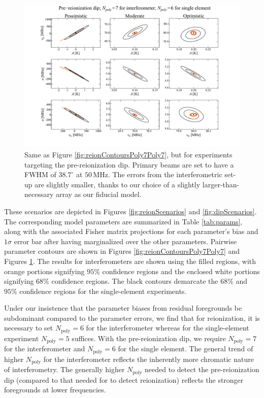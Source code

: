 \documentclass[twocolumn,apj,numberedappendix]{emulateapj}
\newcommand{\acl}[1]{}
\begin{document}
\begin{figure}[t]
	\centering
	\includegraphics[width=1.00\textwidth,trim=3cm 2cm 3cm 0cm,clip] {figures/dipContoursPoly7Poly6.pdf}
	\caption{\acl{Updated the figure and the caption} Same as Figure \ref{fig:reionContoursPoly7Poly7}, but for experiments targeting the pre-reionization dip. Primary beams are set to have a FWHM of $38.7^\circ$ at $50\,\textrm{MHz}$. The errors from the interferometric set-up are slightly smaller, thanks to our choice of a slightly larger-than-necessary array as our fiducial model.}
	\label{fig:dipContoursPoly7Poly6}
\end{figure}

These scenarios are depicted in Figures \ref{fig:reionScenarios} and  \ref{fig:dipScenarios}. The corresponding model parameters are summarized in Table \ref{tab:params}, along with the associated Fisher matrix projections for each parameter's bias and $1\sigma$ error bar after having marginalized over the other parameters. Pairwise parameter contours are shown in Figures \ref{fig:reionContoursPoly7Poly7} and Figures \ref{fig:dipContoursPoly7Poly6}. The results for interferometers are shown using the filled regions, with orange portions signifying $95\%$ confidence regions and the enclosed white portions signifying $68\%$ confidence regions. The black contours demarcate the $68\%$ and $95\%$ confidence regions for the single-element experiments.

\acl{Updated this paragraph to reflect new N-poly}
Under our insistence that the parameter biases from residual foregrounds be subdominant compared to the parameter errors, we find that for reionization, it is necessary to set $N_\textrm{poly} = 6$ for the interferometer whereas for the single-element experiment $N_\textrm{poly} = 5$ suffices. With the pre-reionization dip, we require $N_\textrm{poly} = 7$ for the interferometer and $N_\textrm{poly} = 6$ for the single element. The general trend of higher $N_\textrm{poly}$ for the interferometer reflects the inherently more chromatic nature of interferometry. The generally higher $N_\textrm{poly}$ needed to detect the pre-reionization dip (compared to that needed for to detect reionization) reflects the stronger foregrounds at lower frequencies.
\end{document}
